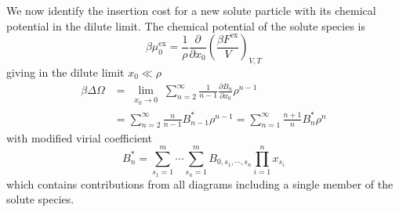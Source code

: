\documentclass[11pt,twoside]{report}
\begin{document}
We now identify the insertion cost for a new solute particle with its chemical potential in the dilute limit.
The chemical potential of the solute species is
\begin{equation}  
  \beta \mu^\mathrm{ex}_0 =
  \frac{1}{\rho}
  \frac{\partial}{\partial x_0}
  \left( \frac{\beta F^\mathrm{ex}}{V} \right)_{V,T}
\end{equation}
giving in the dilute limit $x_0 \ll \rho$
\begin{equation}\label{eq:chemical-potential-mixture}
  \begin{split}
    \beta \Delta\Omega &=
    \lim_{\substack{x_0 \to 0}}
    \sum_{n=2}^\infty
    \frac{1}{n-1}
    \frac{\partial B_n}{\partial x_0}
    \rho^{n-1}
    \\
    &=
    \sum_{n=2}^\infty
    \frac{n}{n-1}
    B_{n-1}^*
    \rho^{n-1}
    =
    \sum_{n=1}^\infty
    \frac{n+1}{n}
    B_n^*
    \rho^n
  \end{split}
\end{equation}
with modified virial coefficient
\begin{equation}
  B_n^* =
  \sum_{s_1=1}^m \cdots \sum_{s_n=1}^m
  B_{0, s_1, \cdots, s_n}
  \prod_{i=1}^n x_{s_i}
\end{equation}
which contains contributions from all diagrams including a single member of the solute species.
\end{document}
